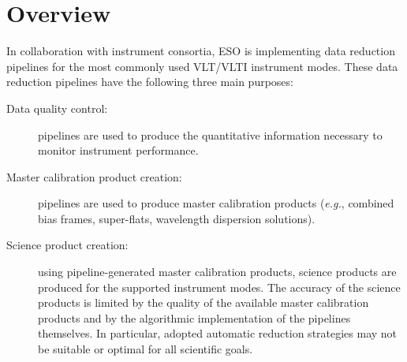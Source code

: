 \section{Overview}
\label{OVER}

In collaboration with instrument consortia, ESO is
implementing data reduction pipelines for the most commonly used VLT/VLTI
instrument modes. These data reduction pipelines have the following three
main purposes:

\begin{description}
\item [Data quality control:] pipelines are used to produce the
quantitative information necessary to monitor instrument performance.
\item [Master calibration product creation:] pipelines are used to
produce master calibration products ({\it e.g.}, combined bias frames,
super-flats, wavelength dispersion solutions).
\item [Science product creation:] using pipeline-generated master
calibration products, science products are produced for the supported
instrument modes. The
accuracy of the science products is limited by the quality of the
available master calibration products and by the algorithmic
implementation of the pipelines themselves. In particular, adopted
automatic reduction strategies may not be suitable or optimal for all
scientific goals.
\end{description}
%
%
%
%
%
%

